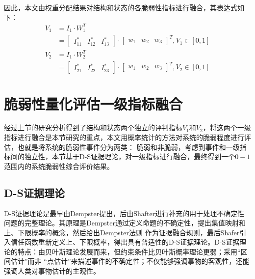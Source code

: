 因此，本文由权重分配结果对结构和状态的各脆弱性指标进行融合，其表达式如下：
\begin{equation}
\begin{aligned} V_{1} &=I_{1} \cdot W_1^{T} \\ &=\left[\begin{array}{lll}{I_{11}^{*}} & {I_{12}^{*}} & {I_{13}^{*}}\end{array}\right] \cdot\left[\begin{array}{lll}{w_{1}} & {w_{2}} & {w_{3}}\end{array}\right]^{T}, V_{1} \in[0,1] \end{aligned}
\end{equation}
\begin{equation}
\begin{aligned} V_{2} &=I_{1} \cdot W_2^{T} \\ &=\left[\begin{array}{lll}{I_{21}^{*}} & {I_{22}^{*}} & {I_{23}^{*}}\end{array}\right] \cdot\left[\begin{array}{lll}{w_{1}} & {w_{2}} & {w_{3}}\end{array}\right]^{T}, V_{2} \in[0,1] \end{aligned}
\end{equation}


\section{脆弱性量化评估一级指标融合}
\label{sec:DS}
经过上节的研究分析得到了结构和状态两个独立的评判指标$V_1$和$V_2$，将这两个一级指标进行融合是本节研究的重点，本文用概率统计的方法对系统的脆弱程度进行评估，也就是将系统的脆弱性事件分为两类：
脆弱和非脆弱，考虑到事件和一级指标间的独立性，本节基于D-S证据理论，对一级指标进行融合，最终得到一个$0-1$范围内的系统脆弱性综合评价结果。

\subsection{D-S证据理论}
\label{sec:DStheory}
D-S证据理论是最早由Dempster提出，后由Shafter进行补充的用于处理不确定性问题的完整理论。其原理是Dempster通过定义命题的不确定性，提出集值映射和上、下限概率的概念，然后给出Dempster法则
作为证据融合规则，最后Shafer引入信任函数重新定义上、下限概率，得出具有普适性的D-S证据理论。D-S证据理论的特点：由贝叶斯理论发展而来，但约束条件比贝叶斯概率理论更弱；采用“区间估计”而非
“点估计”来描述事件的不确定性；不仅能够强调事物的客观性，还能强调人类对事物估计的主观性\cite{refs79}。


